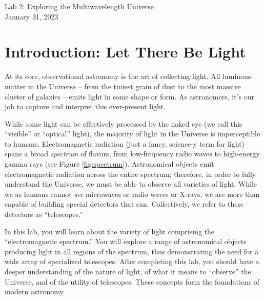\documentclass[11pt]{article}
\begin{document}
\begin{center}
\huge{Lab 2: Exploring the Multiwavelength Universe}\\ \medskip \Large{January 31, 2023}
\end{center}

\section{Introduction: Let There Be Light}
At its core, observational astronomy is the art of collecting light. All luminous matter in the Universe -- from the tiniest grain of dust to the most massive cluster of galaxies -- emits light in some shape or form. As astronomers, it's our job to capture and interpret this ever-present light.

\medskip \noindent
While some light can be effectively processed by the naked eye (we call this ``visible'' or ``optical'' light), the majority of light in the Universe is imperceptible to humans. Electromagnetic radiation (just a fancy, science-y term for light) spans a broad \emph{spectrum} of flavors, from low-frequency radio waves to high-energy gamma rays (see Figure \ref{fig:spectrum}). Astronomical objects emit electromagnetic radiation across the entire spectrum; therefore, in order to fully understand the Universe, we must be able to observe all varieties of light. While we as humans cannot \emph{see} microwaves or radio waves or X-rays, we are more than capable of building special detectors that can. Collectively, we refer to these detectors as ``telescopes.''

\medskip \noindent
In this lab, you will learn about the variety of light comprising the ``electromagnetic spectrum.'' You will explore a range of astronomical objects producing light in all regions of the spectrum, thus demonstrating the need for a wide array of specialized telescopes. After completing this lab, you should have a deeper understanding of the nature of light, of what it means to ``observe'' the Universe, and of the utility of telescopes. These concepts form the foundations of modern astronomy. 

\end{document}

